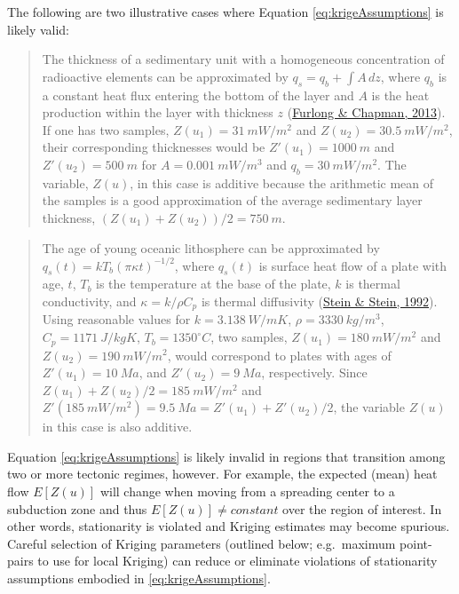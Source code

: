 The following are two illustrative cases where Equation \eqref{eq:krigeAssumptions} is likely valid:

\begin{quote}
The thickness of a sedimentary unit with a homogeneous concentration of radioactive elements can be approximated by \(q_s = q_b + \int A \,dz\), where \(q_b\) is a constant heat flux entering the bottom of the layer and \(A\) is the heat production within the layer with thickness \(z\) (\protect\hyperlink{ref-furlong2013}{Furlong \& Chapman, 2013}). If one has two samples, \(Z(u_1) = 31~mW/m^2\) and \(Z(u_2) = 30.5~mW/m^2\), their corresponding thicknesses would be \(Z'(u_1) = 1000~m\) and \(Z'(u_2) = 500~m\) for \(A = 0.001~mW/m^3\) and \(q_b = 30~mW/m^2\). The variable, \(Z(u)\), in this case is additive because the arithmetic mean of the samples is a good approximation of the average sedimentary layer thickness, \((Z(u_1) + Z(u_2)) / 2 = 750~m\).
\end{quote}

\begin{quote}
The age of young oceanic lithosphere can be approximated by \(q_s(t) = kT_b(\pi\kappa t)^{-1/2}\), where \(q_s(t)\) is surface heat flow of a plate with age, \(t\), \(T_b\) is the temperature at the base of the plate, \(k\) is thermal conductivity, and \(\kappa = k/\rho C_p\) is thermal diffusivity (\protect\hyperlink{ref-stein1992}{Stein \& Stein, 1992}). Using reasonable values for \(k = 3.138~W/mK\), \(\rho = 3330~kg/m^3\), \(C_p = 1171~J/kgK\), \(T_b = 1350^{\circ}C\), two samples, \(Z(u_1) = 180~mW/m^2\) and \(Z(u_2) = 190~mW/m^2\), would correspond to plates with ages of \(Z'(u_1) = 10~Ma\), and \(Z'(u_2) = 9~Ma\), respectively. Since \(Z(u_1) + Z(u_2) / 2 = 185~mW/m^2\) and \(Z'(185~mW/m^2) = 9.5~Ma = Z'(u_1) + Z'(u_2) / 2\), the variable \(Z(u)\) in this case is also additive.
\end{quote}

Equation \eqref{eq:krigeAssumptions} is likely invalid in regions that transition among two or more tectonic regimes, however. For example, the expected (mean) heat flow \(E[Z(u)]\) will change when moving from a spreading center to a subduction zone and thus \(E[Z(u)] \neq constant\) over the region of interest. In other words, stationarity is violated and Kriging estimates may become spurious. Careful selection of Kriging parameters (outlined below; e.g.~maximum point-pairs to use for local Kriging) can reduce or eliminate violations of stationarity assumptions embodied in \eqref{eq:krigeAssumptions}.

